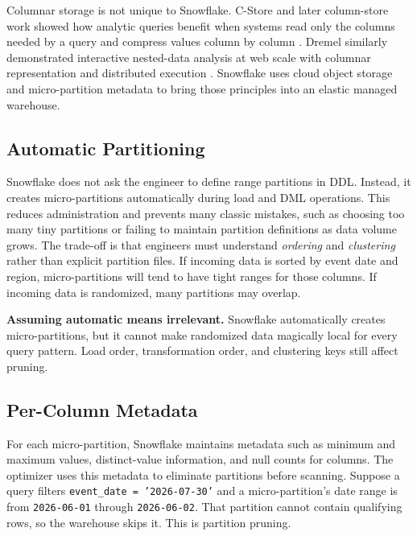 Columnar storage is not unique to Snowflake. C-Store and later column-store work showed how analytic queries benefit when systems read only the columns needed by a query and compress values column by column \cite{stonebraker2005cstore,abadi2009columnstores}. Dremel similarly demonstrated interactive nested-data analysis at web scale with columnar representation and distributed execution \cite{melnik2010dremel}. Snowflake uses cloud object storage and micro-partition metadata to bring those principles into an elastic managed warehouse.

\subsection{Automatic Partitioning}
Snowflake does not ask the engineer to define range partitions in DDL. Instead, it creates micro-partitions automatically during load and DML operations. This reduces administration and prevents many classic mistakes, such as choosing too many tiny partitions or failing to maintain partition definitions as data volume grows. The trade-off is that engineers must understand \emph{ordering} and \emph{clustering} rather than explicit partition files. If incoming data is sorted by event date and region, micro-partitions will tend to have tight ranges for those columns. If incoming data is randomized, many partitions may overlap.

\begin{pitfall}
\textbf{Assuming automatic means irrelevant.} Snowflake automatically creates micro-partitions, but it cannot make randomized data magically local for every query pattern. Load order, transformation order, and clustering keys still affect pruning.
\end{pitfall}

\subsection{Per-Column Metadata}
For each micro-partition, Snowflake maintains metadata such as minimum and maximum values, distinct-value information, and null counts for columns. The optimizer uses this metadata to eliminate partitions before scanning. Suppose a query filters \texttt{event\_date = '2026-07-30'} and a micro-partition's date range is from \texttt{2026-06-01} through \texttt{2026-06-02}. That partition cannot contain qualifying rows, so the warehouse skips it. This is partition pruning.

